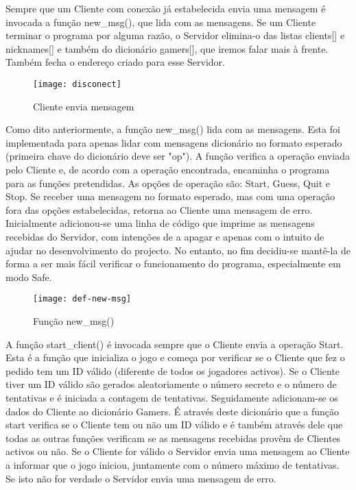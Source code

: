 Sempre que um Cliente com conexão já estabelecida envia uma mensagem é invocada a função new\_msg(), que lida com as mensagens.
Se um Cliente terminar o programa por alguma razão, o Servidor elimina-o das listas clients[] e nicknames[] e também do dicionário gamers[], que iremos falar mais à frente. Também fecha o endereço criado para esse Servidor.
 
\begin{figure}[H]
	\centering
	\texttt{[image: disconect]}
	\caption{Cliente envia mensagem\\}
	\label{fig:disconect}
\end{figure} 

Como dito anteriormente, a função new\_msg() lida com as mensagens. Esta foi implementada para apenas lidar com mensagens dicionário no formato esperado (primeira chave do dicionário deve ser "op"). A função verifica a operação enviada pelo Cliente e, de acordo com a operação encontrada, encaminha o programa para as funções pretendidas. As opções de operação são: Start, Guess, Quit e Stop. Se receber uma mensagem no formato esperado, mas com uma operação fora das opções estabelecidas, retorna ao Cliente uma mensagem de erro.
Inicialmente adicionou-se uma linha de código que imprime as mensagens recebidas do Servidor, com intenções de a apagar e apenas com o intuito de ajudar no desenvolvimento do projecto. No entanto, no fim decidiu-se mantê-la de forma a ser mais fácil verificar o funcionamento do programa, especialmente em modo Safe.

\begin{figure}[H]
	\centering
	\texttt{[image: def-new-msg]}
	\caption{Função new\_msg()\\}
	\label{fig:def-new-msg}
\end{figure} 

A função start\_client() é invocada sempre que o Cliente envia a operação Start.
Esta é a função que inicializa o jogo e começa por verificar se o Cliente que fez o pedido tem um ID válido (diferente de todos os jogadores activos). Se o Cliente tiver um ID válido são gerados aleatoriamente o número secreto e o número de tentativas e é iniciada a contagem de tentativas. Seguidamente adicionam-se os dados do Cliente ao dicionário Gamers. É através deste dicionário que a função start verifica se o Cliente tem ou não um ID válido e é também através dele que todas as outras funções verificam se as mensagens recebidas provêm de Clientes activos ou não.
Se o Cliente for válido o Servidor envia uma mensagem ao Cliente a informar que o jogo iniciou, juntamente com o número máximo de tentativas. Se isto não for verdade o Servidor envia uma mensagem de erro.

